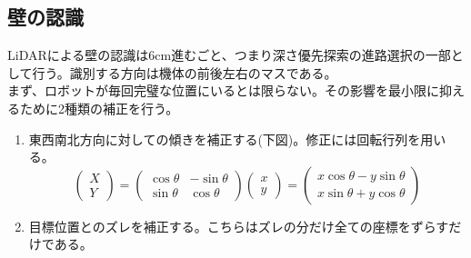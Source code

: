 \documentclass[uplatex,dvipdfmx,a4paper]{jsarticle}
\begin{document}
    \subsection{壁の認識}
    \noindent
    LiDARによる壁の認識は6cm進むごと、つまり深さ優先探索の進路選択の一部として行う。識別する方向は機体の前後左右のマスである。\\
    \noindent
    まず、ロボットが毎回完璧な位置にいるとは限らない。その影響を最小限に抑えるために2種類の補正を行う。
    \begin{enumerate}
      \item 東西南北方向に対しての傾きを補正する(下図)。修正には回転行列を用いる。\\
      $$
      \begin{pmatrix}
      X\\
      Y
      \end{pmatrix}
      =
      \begin{pmatrix}
      \cos\theta & -\sin\theta \\
      \sin\theta & \cos\theta
      \end{pmatrix}
      \begin{pmatrix}
      x\\
      y
      \end{pmatrix}
      =
      \begin{pmatrix}
      x\cos\theta - y\sin\theta \\
      x\sin\theta + y\cos\theta
      \end{pmatrix}
      $$
      \item 目標位置とのズレを補正する。こちらはズレの分だけ全ての座標をずらすだけである。
    \end{enumerate}
\end{document}
